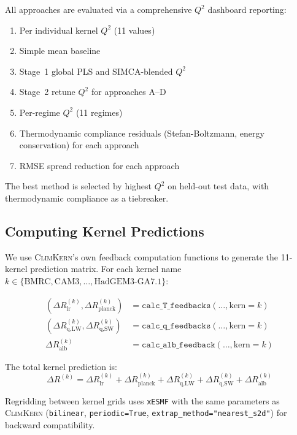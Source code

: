 \documentclass[11pt]{article}
\newcommand{\Qsq}{Q^{2}}
\newcommand{\oldsystem}{\textsc{ClimKern}}
\begin{document}
All approaches are evaluated via a comprehensive $\Qsq$ dashboard
reporting:
\begin{enumerate}[noitemsep]
  \item Per individual kernel $\Qsq$ (11 values)
  \item Simple mean baseline
  \item Stage~1 global PLS and SIMCA-blended $\Qsq$
  \item Stage~2 retune $\Qsq$ for approaches A--D
  \item Per-regime $\Qsq$ (11 regimes)
  \item Thermodynamic compliance residuals (Stefan-Boltzmann,
    energy conservation) for each approach
  \item RMSE spread reduction for each approach
\end{enumerate}

The best method is selected by highest $\Qsq$ on held-out test
data, with thermodynamic compliance as a tiebreaker.

\subsection{Computing Kernel Predictions}

We use \oldsystem{}'s own feedback computation functions to
generate the 11-kernel prediction matrix. For each kernel name
$k \in \{\text{BMRC}, \text{CAM3}, \ldots, \text{HadGEM3-GA7.1}\}$:

\begin{align}
  (\Delta R_\text{lr}^{(k)}, \Delta R_\text{planck}^{(k)})
    &= \texttt{calc\_T\_feedbacks}(\ldots, \text{kern}=k)
    \nonumber \\
  (\Delta R_\text{q,LW}^{(k)}, \Delta R_\text{q,SW}^{(k)})
    &= \texttt{calc\_q\_feedbacks}(\ldots, \text{kern}=k)
    \nonumber \\
  \Delta R_\text{alb}^{(k)}
    &= \texttt{calc\_alb\_feedback}(\ldots, \text{kern}=k)
  \label{eq:climkern_calls}
\end{align}

The total kernel prediction is:
\begin{equation}
  \Delta R^{(k)} = \Delta R_\text{lr}^{(k)}
    + \Delta R_\text{planck}^{(k)}
    + \Delta R_\text{q,LW}^{(k)}
    + \Delta R_\text{q,SW}^{(k)}
    + \Delta R_\text{alb}^{(k)}
  \label{eq:total_kernel}
\end{equation}

Regridding between kernel grids uses \texttt{xESMF} with the
same parameters as \oldsystem{} (\texttt{bilinear},
\texttt{periodic=True}, \texttt{extrap\_method="nearest\_s2d"})
for backward compatibility.
\end{document}
